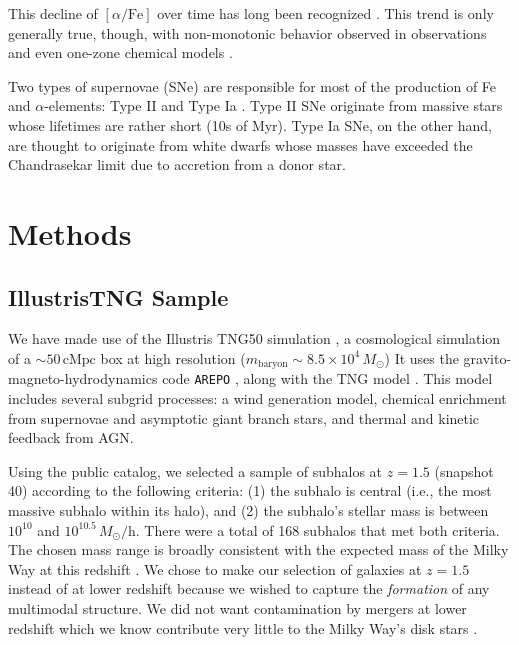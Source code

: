 \documentclass[linenumbers, twocolumn]{aastex631}
\newcommand{\Msun}{\ensuremath{M_{\odot}}}
\newcommand{\alphaFe}{\ensuremath{[\alpha/\textrm{Fe}]}}
\begin{document}
This decline of \alphaFe{} over time has long been recognized \citep{1979ApJ...229.1046T}. This trend is only generally true, though, with non-monotonic behavior observed in observations and even one-zone chemical models \citep[e.g.][]{2022arXiv220402989C}. 

Two types of supernovae (SNe) are responsible for most of the production of Fe and $\alpha$-elements: Type II and Type Ia \citep{2023A&ARv..31....1A}. Type II SNe originate from massive stars whose lifetimes are rather short (10s of Myr). Type Ia SNe, on the other hand, are thought to originate from white dwarfs whose masses have exceeded the Chandrasekar limit due to accretion from a donor star.

\section{Methods}\label{sec:methods}
\subsection{IllustrisTNG Sample}\label{ssec:tng}
We have made use of the Illustris TNG50 simulation \citep{2019MNRAS.490.3196P, 2019MNRAS.490.3234N}, a cosmological simulation of a $\sim50\,\textrm{cMpc}$ box at high resolution ($m_{\textrm{baryon}}\sim8.5\times10^4\,\Msun$) It uses the gravito-magneto-hydrodynamics code \texttt{AREPO} \citep{2010MNRAS.401..791S, 2016MNRAS.455.1134P}, along with the TNG model \citep{2017MNRAS.465.3291W, 2018MNRAS.473.4077P}. This model includes several subgrid processes: a wind generation model, chemical enrichment from supernovae and asymptotic giant branch stars, and thermal and kinetic feedback from AGN.

Using the public catalog, we selected a sample of subhalos at $z=1.5$ (snapshot 40) according to the following criteria: (1) the subhalo is central (i.e., the most massive subhalo within its halo), and (2) the subhalo's stellar mass is between $10^{10}$ and $10^{10.5}\,\Msun/\textrm{h}$. There were a total of 168 subhalos that met both criteria. The chosen mass range is broadly consistent with the expected mass of the Milky Way at this redshift \citep{2013ApJ...771L..35V}. We chose to make our selection of galaxies at $z=1.5$ instead of at lower redshift because we wished to capture the \textit{formation} of any multimodal structure. We did not want contamination by mergers at lower redshift which we know contribute very little to the Milky Way's disk stars \citep[e.g.][]{2016ARA&A..54..529B}.
\end{document}
